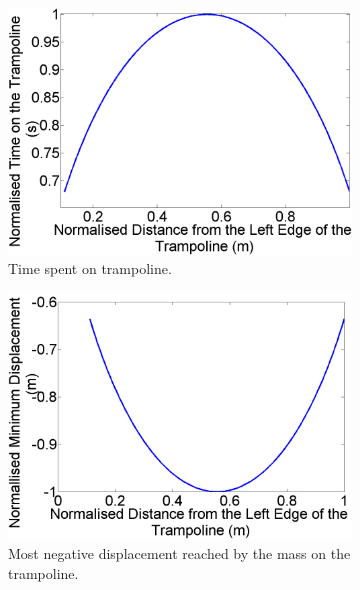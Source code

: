 \begin{figure}[H]
	\centering
    \begin{subfigure}[t]{0.3\textwidth}
		\includegraphics[width=\textwidth]{Norm_Time_DistEdge.png}
    	\caption{Time spent on trampoline.}\label{fig:Norm_Time_DistEdge}
    \end{subfigure}\hfill
	\begin{subfigure}[t]{0.3\textwidth}
		\includegraphics[width=\textwidth]{Norm_MinY_DistEdge.png}
    	\caption{Most negative displacement reached by the mass on the trampoline.}\label{fig:Norm_MinY_DistEdge}
    \end{subfigure}\hfill
    \begin{subfigure}[t]{0.3\textwidth}

\end{subfigure}
\end{figure}
